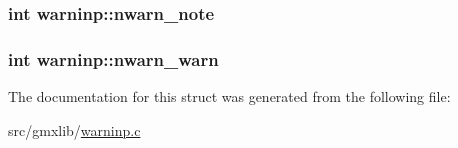\hypertarget{structwarninp_a9bd55035be4dcc956712af5f7e2df8fb}{
\subsubsection[{nwarn\-\_\-note}]{\setlength{\rightskip}{0pt plus 5cm}int {\bf warninp\-::nwarn\-\_\-note}}}\label{structwarninp_a9bd55035be4dcc956712af5f7e2df8fb}
\hypertarget{structwarninp_a98cea1623364e26576924677b3911e32}{
\subsubsection[{nwarn\-\_\-warn}]{\setlength{\rightskip}{0pt plus 5cm}int {\bf warninp\-::nwarn\-\_\-warn}}}\label{structwarninp_a98cea1623364e26576924677b3911e32}


\-The documentation for this struct was generated from the following file\-:\begin{DoxyCompactItemize}
\item 
src/gmxlib/\hyperlink{warninp_8c}{warninp.\-c}\end{DoxyCompactItemize}
